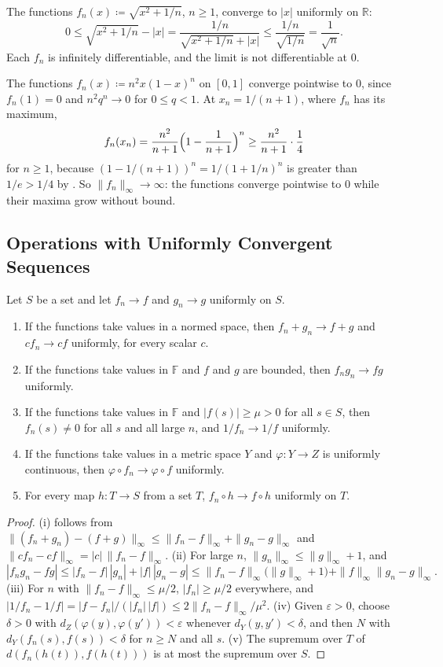 The functions $f_n(x)\coloneqq\sqrt{x^2+1/n}$, $n\ge1$, converge to $|x|$ uniformly on $\mathbb R$:
\[
0\le\sqrt{x^2+1/n}-|x|=\frac{1/n}{\sqrt{x^2+1/n}+|x|}\le\frac{1/n}{\sqrt{1/n}}=\frac1{\sqrt n}.
\]
Each $f_n$ is infinitely differentiable, and the limit is not differentiable at $0$.

The functions $f_n(x)\coloneqq n^2x(1-x)^n$ on $[0,1]$ converge pointwise to $0$, since $f_n(1)=0$ and $n^2q^n\to0$ for $0\le q<1$. At $x_n=1/(n+1)$, where $f_n$ has its maximum,
\[
f_n(x_n)=\frac{n^2}{n+1}\Bigl(1-\frac1{n+1}\Bigr)^n\ge\frac{n^2}{n+1}\cdot\frac14
\]
for $n\ge1$, because $(1-1/(n+1))^n=1/(1+1/n)^n$ is greater than $1/e>1/4$ by . So $\|f_n\|_\infty\to\infty$: the functions converge pointwise to $0$ while their maxima grow without bound.

\subsection{Operations with Uniformly Convergent Sequences}

\begin{proposition}[Operations]
\label{prop:uniform-operations}
Let $S$ be a set and let $f_n\to f$ and $g_n\to g$ uniformly on $S$.
\begin{enumerate}
\item If the functions take values in a normed space, then $f_n+g_n\to f+g$ and $cf_n\to cf$ uniformly, for every scalar $c$.
\item If the functions take values in $\mathbb F$ and $f$ and $g$ are bounded, then $f_ng_n\to fg$ uniformly.
\item If the functions take values in $\mathbb F$ and $|f(s)|\ge\mu>0$ for all $s\in S$, then $f_n(s)\ne0$ for all $s$ and all large $n$, and $1/f_n\to1/f$ uniformly.
\item If the functions take values in a metric space $Y$ and $\varphi\colon Y\to Z$ is uniformly continuous, then $\varphi\circ f_n\to\varphi\circ f$ uniformly.
\item For every map $h\colon T\to S$ from a set $T$, $f_n\circ h\to f\circ h$ uniformly on $T$.
\end{enumerate}
\end{proposition}

\begin{proof}
(i) follows from $\|(f_n+g_n)-(f+g)\|_\infty\le\|f_n-f\|_\infty+\|g_n-g\|_\infty$ and $\|cf_n-cf\|_\infty=|c|\,\|f_n-f\|_\infty$. (ii) For large $n$, $\|g_n\|_\infty\le\|g\|_\infty+1$, and
\[
|f_ng_n-fg|\le|f_n-f|\,|g_n|+|f|\,|g_n-g|\le\|f_n-f\|_\infty\bigl(\|g\|_\infty+1\bigr)+\|f\|_\infty\|g_n-g\|_\infty .
\]
(iii) For $n$ with $\|f_n-f\|_\infty\le\mu/2$, $|f_n|\ge\mu/2$ everywhere, and $|1/f_n-1/f|=|f-f_n|/(|f_n|\,|f|)\le2\|f_n-f\|_\infty/\mu^2$. (iv) Given $\varepsilon>0$, choose $\delta>0$ with $d_Z(\varphi(y),\varphi(y'))<\varepsilon$ whenever $d_Y(y,y')<\delta$, and then $N$ with $d_Y(f_n(s),f(s))<\delta$ for $n\ge N$ and all $s$. (v) The supremum over $T$ of $d(f_n(h(t)),f(h(t)))$ is at most the supremum over $S$.
\end{proof}

